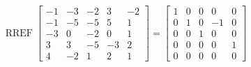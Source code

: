 \begin{exerciseAnswer} 


\[\operatorname{RREF} \left[\begin{array}{ccccc}
-1 & -3 & -2 & 3 & -2 \\
-1 & -5 & -5 & 5 & 1 \\
-3 & 0 & -2 & 0 & 1 \\
3 & 3 & -5 & -3 & 2 \\
4 & -2 & 1 & 2 & 1
\end{array}\right] = \left[\begin{array}{ccccc}
1 & 0 & 0 & 0 & 0 \\
0 & 1 & 0 & -1 & 0 \\
0 & 0 & 1 & 0 & 0 \\
0 & 0 & 0 & 0 & 1 \\
0 & 0 & 0 & 0 & 0
\end{array}\right] \]



\end{exerciseAnswer}
